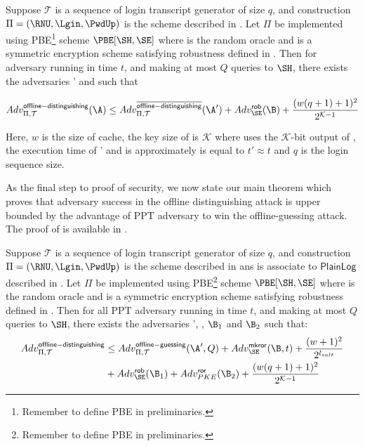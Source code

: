 \begin{lemma}
	Suppose $ \mathcal{T} $ is a sequence of login transcript generator of size $ q $, and construction $ \Pi = (\RNU, \Lgin, \PwdUp) $ is the scheme described in . Let $ \Pi $ be implemented using PBE\footnote{ Remember to define PBE in preliminaries.}  scheme $ \PBE [\SH, \SE]$ where \SH is the random oracle and \SE is a symmetric encryption scheme satisfying robustness defined in . Then for adversary \A running in time $ t $, and making at most $ Q $ queries to $ \SH $, there exists the adversaries \A' and \B such that 
	
	\begin{align}
	Adv_{\Pi, \mathcal{T}}^{\mathsf{offline-distinguishing}} (\A)\leq Adv_{\Pi, \mathcal{T}}^{\overline{\mathsf{offline-distinguishing}}} (\A') + Adv_{\SE}^{\mathsf{rob}}(\B) + \dfrac{(w(q+1) + 1)^2}{2^{\mathcal{K}-1}} 
	\end{align}
	
	Here, $ w $ is the size of cache, the key size of \SE is $ \mathcal{K} $ where \SE uses the $ \mathcal{K} $-bit output of \SH, the execution time of \A' and \B is approximately is equal to  $ t'\approx t $ and $ q $ is the login sequence size.
\end{lemma}

As the final step to proof of security, we now state our main theorem which proves that adversary success in the offline distinguishing attack is upper bounded by the advantage of PPT adversary to win the offline-guessing attack. The proof of  is available in .

 \begin{theorem} 
 	Suppose $ \mathcal{T} $ is a sequence of login transcript generator of size $ q $, and construction $ \Pi = (\RNU, \Lgin, \PwdUp) $ is the scheme described in  ans is associate to $ \mathsf{PlainLog} $ described in . Let $ \Pi $ be implemented using PBE\footnote{ Remember to define PBE in preliminaries.} scheme $ \PBE [\SH, \SE]$ where \SH is the random oracle and \SE is a symmetric encryption scheme satisfying robustness defined in . Then for all PPT adversary \A running in time $ t $, and making at most $ Q $ queries to $ \SH $, there exists the adversaries \A', \B, $ \B_1 $  and $ \B_2 $ such that: 
 	\begin{align}
 	Adv_{\Pi, \mathcal{T}}^{\mathsf{offline-distinguishing}} & \leq Adv_{\Pi, \mathcal{T}}^{\mathsf{offline-guessing}}(\A', Q) + Adv_{\SE}^{\mathsf{mkror}}(\B, t)  + \dfrac{(w + 1)^2}{2^{l_{salt}}}  \nonumber\\
 	& + Adv_{\SE}^{\mathsf{rob}}(\B_1) + Adv_{PKE}^{\mathsf{ror}}(\B_2) + \dfrac{(w(q+1) + 1)^2}{2^{\mathcal{K}-1}} 
 	\end{align} 
 \end{theorem}
 
